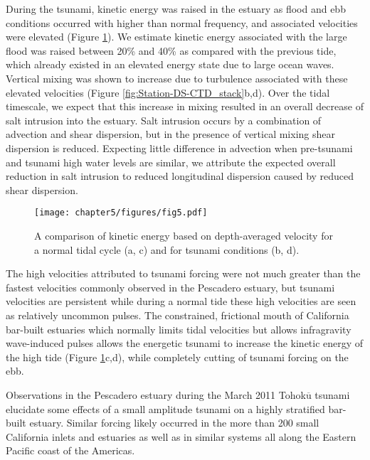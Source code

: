 During the tsunami, kinetic energy was raised in the estuary as flood
and ebb conditions occurred with higher than normal frequency, and
associated velocities were elevated (Figure \ref{fig:kinetic_energy}).
We estimate kinetic energy associated with the large flood was raised
between 20\% and 40\% as compared with the previous tide, which already
existed in an elevated energy state due to large ocean waves. Vertical
mixing was shown to increase due to turbulence associated with these
elevated velocities (Figure \ref{fig:Station-DS-CTD_stack}b,d). Over
the tidal timescale, we expect that this increase in mixing resulted
in an overall decrease of salt intrusion into the estuary. Salt intrusion
occurs by a combination of advection and shear dispersion, but in
the presence of vertical mixing shear dispersion is reduced. Expecting
little difference in advection when pre-tsunami and tsunami high water
levels are similar, we attribute the expected overall reduction in
salt intrusion to reduced longitudinal dispersion caused by reduced
shear dispersion. 

\begin{figure}
\centering
\texttt{[image: chapter5/figures/fig5.pdf]}

\protect\caption{A comparison of kinetic energy based on depth-averaged velocity for
a normal tidal cycle (a, c) and for tsunami conditions (b, d). \label{fig:kinetic_energy}}
\end{figure}


The high velocities attributed to tsunami forcing were not much greater
than the fastest velocities commonly observed in the Pescadero estuary,
but tsunami velocities are persistent while during a normal tide these
high velocities are seen as relatively uncommon pulses. The constrained,
frictional mouth of California bar-built estuaries which normally
limits tidal velocities but allows infragravity wave-induced pulses
allows the energetic tsunami to increase the kinetic energy of the
high tide (Figure \ref{fig:kinetic_energy}c,d), while completely
cutting of tsunami forcing on the ebb. 

Observations in the Pescadero estuary during the March 2011 Tohok$\overline{\mathrm{u}}$
tsunami elucidate some effects of a small amplitude tsunami on a highly
stratified bar-built estuary. Similar forcing likely occurred in the
more than 200 small California inlets and estuaries as well as in similar
systems all along the Eastern Pacific coast of the Americas. 






